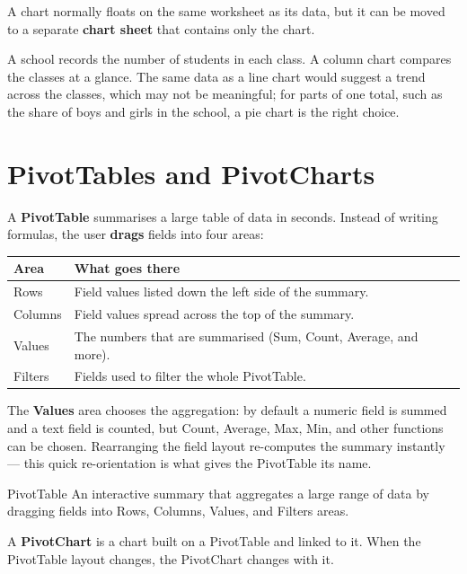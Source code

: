 A chart normally floats on the same worksheet as its data, but it can be moved
to a separate \textbf{chart sheet} that contains only the chart.

\begin{example}
A school records the number of students in each class. A column chart compares
the classes at a glance. The same data as a line chart would suggest a trend
across the classes, which may not be meaningful; for parts of one total, such as
the share of boys and girls in the school, a pie chart is the right choice.
\end{example}

\section{PivotTables and PivotCharts}
A \textbf{PivotTable} summarises a large table of data in seconds. Instead of
writing formulas, the user \textbf{drags} fields into four areas:

\begin{center}
\begin{tabular}{p{}p{}}
\toprule
\textbf{Area} & \textbf{What goes there} \\
\midrule
Rows & Field values listed down the left side of the summary. \\
Columns & Field values spread across the top of the summary. \\
Values & The numbers that are summarised (Sum, Count, Average, and more). \\
Filters & Fields used to filter the whole PivotTable. \\
\bottomrule
\end{tabular}
\end{center}

The \textbf{Values} area chooses the aggregation: by default a numeric field is
summed and a text field is counted, but Count, Average, Max, Min, and other
functions can be chosen. Rearranging the field layout re-computes the summary
instantly --- this quick re-orientation is what gives the PivotTable its name.

\begin{definitionbox}{PivotTable}
An interactive summary that aggregates a large range of data by dragging fields
into Rows, Columns, Values, and Filters areas.
\end{definitionbox}

A \textbf{PivotChart} is a chart built on a PivotTable and linked to it. When
the PivotTable layout changes, the PivotChart changes with it.


